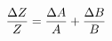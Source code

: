 \documentclass[preview]{standalone}
\begin{document}
\begin{align*}
\special{dvisvgm:raw <g id='unique000'>}\frac{\Delta Z}{Z} = \frac{\Delta A}{A} + \frac{\Delta B}{B}\special{dvisvgm:raw </g>}
\end{align*}
\end{document}
